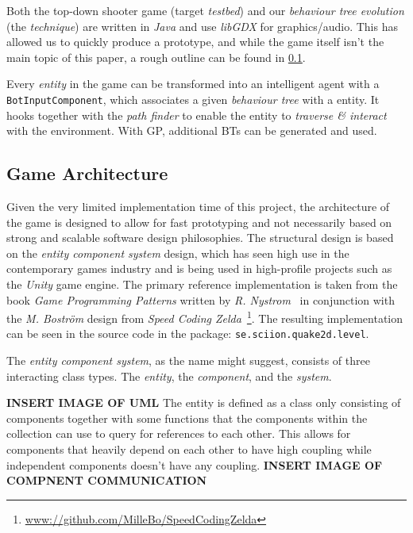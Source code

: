 \documentclass[a4paper, twocolumn]{article}
\begin{document}
        Both the top-down shooter game (target \emph{testbed}) and our \emph{behaviour tree evolution} (the \emph{technique}) are written in \emph{Java} and use \emph{libGDX} for graphics/audio. This has allowed us to quickly produce a prototype, and while the game itself isn't the main topic of this paper, a rough outline can be found in \cref{sec:game_architecture}.

        Every \emph{entity} in the game can be transformed into an intelligent agent with a \texttt{BotInputComponent}, which associates a given \emph{behaviour tree} with a entity. It hooks together with the \emph{path finder} to enable the entity to \emph{traverse \& interact} with the environment. With GP, additional BTs can be generated and used.

        \newpage

        \subsection{Game Architecture} \label{sec:game_architecture}

        Given the very limited implementation time of this project, the architecture of the game is designed to allow for fast prototyping and not necessarily based on strong and scalable software design philosophies. The structural design is based on the \textit{entity component system} design, which has seen high use in the contemporary games industry and is being used in high-profile projects such as the \textit{Unity} game engine. The primary reference implementation is taken from the book \textit{Game Programming Patterns} written by \textit{R. Nystrom}~\cite{nystrom2014game} in conjunction with the \textit{M. Boström} design from \textit{Speed Coding Zelda}~\footnote{\url{www://github.com/MilleBo/SpeedCodingZelda}}. The resulting implementation can be seen in the source code in the package: \texttt{se.sciion.quake2d.level}.

        The \textit{entity component system}, as the name might suggest, consists of three interacting class types. The \textit{entity}, the \textit{component}, and the \textit{system}.

        \textbf{INSERT IMAGE OF UML}
        The entity is defined as a class only consisting of components together with some functions that the components within the collection can use to query for references to each other. This allows for components that heavily depend on each other to have high coupling while independent components doesn't have any coupling.
        \textbf{INSERT IMAGE OF COMPNENT COMMUNICATION}
\end{document}
